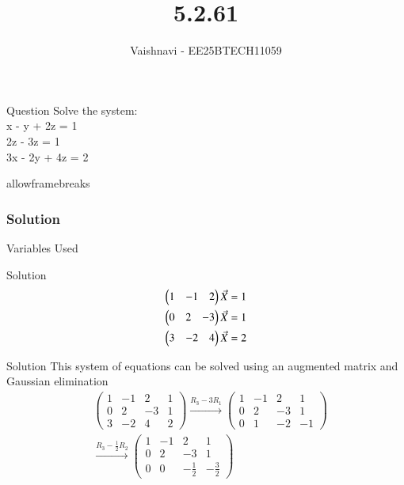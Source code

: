 \documentclass{beamer}
\title %
{5.2.61}
\author %
{Vaishnavi - EE25BTECH11059}
\begin{document}
\frame{\titlepage}
\begin{frame}{Question}
Solve the system:\\
  x - y + 2z = 1 \\
   2z - 3z = 1 \\
  3x - 2y + 4z = 2
\end{frame}
\begin{frame}{allowframebreaks}
\frametitle{Solution}
\begin{table}[H]    
  \centering
  
  \caption{Variables Used}
  \label{tab:1.10.2}
\end{table}

\end{frame}
\begin{frame}{Solution}
 \begin{align}
    \begin{pmatrix}1 & -1 & 2\end{pmatrix}\Vec{X}=1\\
     \begin{pmatrix}0 & 2 & -3\end{pmatrix}\Vec{X}=1\\
      \begin{pmatrix}3 & -2 & 4\end{pmatrix}\Vec{X}=2
\end{align}
\end{frame}


\begin{frame}{Solution}
This system of equations can be solved using an augmented matrix and Gaussian elimination
\begin{align}
&\left(
\begin{array}{ccc|c}
1 & -1 & 2 & 1 \\
0 & 2 & -3 & 1 \\
3 & -2 & 4 & 2
\end{array}
\right)
\xrightarrow{R_3 - 3R_1}
\left(
\begin{array}{ccc|c}
1 & -1 & 2 & 1 \\
0 & 2 & -3 & 1 \\
0 & 1 & -2 & -1
\end{array}
\right) \\
&\xrightarrow{R_3 - \frac{1}{2} R_2}
\left(
\begin{array}{ccc|c}
1 & -1 & 2 & 1 \\
0 & 2 & -3 & 1 \\
0 & 0 & -\frac{1}{2} & -\frac{3}{2}
\end{array}
\right) 
\end{align}
\end{frame}
\end{document}
